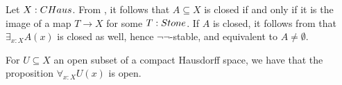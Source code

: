 \begin{remark}\label{InhabitedClosedSubSpaceClosedCHaus}
  Let $X:\Chaus$.
  From , it follows that $A\subseteq X$ is closed if and only if it is the image of a map 
  $T\to X$ for some $T:\Stone$. 
  If $A$ is closed, it follows from  that $\exists_{x:X} A(x)$ is closed as well, 
  hence $\neg\neg$-stable, and equivalent to $A \neq \emptyset$. 
\end{remark}


\begin{corollary}\label{AllOpenSubspaceOpen}
  For $U\subseteq X$ an open subset of a compact Hausdorff space, we have that the proposition 
  $\forall_{x:X} U(x)$ is open. 
\end{corollary}

